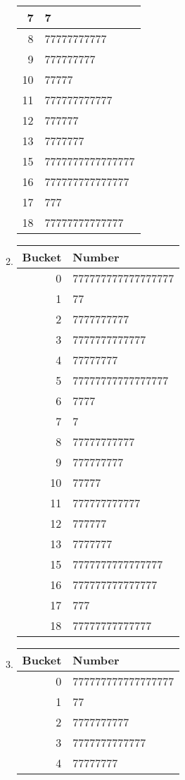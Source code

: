 \documentclass[12pt]{article}
\begin{document}
\begin{enumerate}[a]
\begin{multicols}{2}
\begin{enumerate}[1]
\begin{tabular}{r|l}
			7 & 7\\\hline
			8 & 77777777777\\\hline
			9 & 777777777\\\hline
			10 & 77777\\\hline
			11 & 777777777777\\\hline
			12 & 777777\\\hline
			13 & 7777777\\\hline
			15 & 7777777777777777\\\hline
			16 & 777777777777777\\\hline
			17 & 777\\\hline
			18 & 77777777777777
		\end{tabular}
		\item
		\begin{tabular}{r|l}
			Bucket & Number\\\hline\hline
			0 & 777777777777777777\\\hline
			1 & 77\\\hline
			2 & 7777777777\\\hline
			3 & 7777777777777\\\hline
			4 & 77777777\\\hline
			5 & 77777777777777777\\\hline
			6 & 7777\\\hline
			7 & 7\\\hline
			8 & 77777777777\\\hline
			9 & 777777777\\\hline
			10 & 77777\\\hline
			11 & 777777777777\\\hline
			12 & 777777\\\hline
			13 & 7777777\\\hline
			15 & 7777777777777777\\\hline
			16 & 777777777777777\\\hline
			17 & 777\\\hline
			18 & 77777777777777
		\end{tabular}
		\item
		\begin{tabular}{r|l}
			Bucket & Number\\\hline\hline
			0 & 777777777777777777\\\hline
			1 & 77\\\hline
			2 & 7777777777\\\hline
			3 & 7777777777777\\\hline
			4 & 77777777\\\hline

\end{tabular}
\end{enumerate}
\end{multicols}
\end{enumerate}
\end{document}
